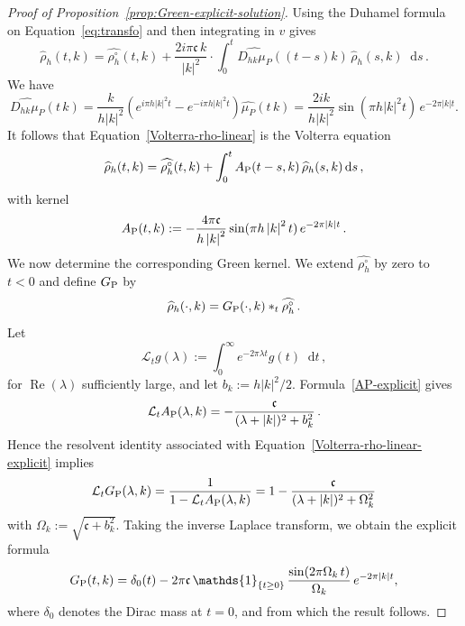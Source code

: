 \documentclass[a4paper,12pt]{amsart} %
\theoremstyle{plain}
\theoremstyle{definition}
\renewcommand	{\L}		{\mathcal L}		%
\newcommand		{\lt}			{\left}				%
\newcommand		{\rt}			{\right}			%
\renewcommand	{\(}			{\lt(}
\renewcommand	{\)}			{\rt)}
\newcommand		{\n}[1]			{\lt\lvert{#1}\rt\rvert}	%
\newcommand		{\indic}	{\mathds{1}}		%
\renewcommand		{\d}		{\mathop{}\!\mathrm{d}}		%
\DeclareMathOperator{\re}		{Re}				%
\renewcommand	{\Re}[1]		{\re\!\( #1 \)}		%
\newcommand	{\h}			{h}
\newcommand		{\CK}			{\mathfrak{c}}	%
\begin{document}
	\begin{proof}[Proof of Proposition~\ref{prop:Green-explicit-solution}]
		Using the Duhamel formula on Equation~\eqref{eq:transfo} and then integrating in $v$ gives
		\begin{equation}\label{Volterra-rho-linear}
			\widehat\rho_\h(t,k) = \widehat{\rho_\h^\circ}(t,k) + \frac{2i\pi\CK\, k}{\n{k}^2}\cdot \int_0^t
			\widehat{D_{hk}\mu_P}(\lt(t-s\rt) k) \,\widehat\rho_\h(s,k) \d s \, .
		\end{equation}
		We have 
		\begin{equation*} %
		\widehat{D_{hk}\mu_P}(t\, k)
			=\frac{k}{h\n{k}^2}
			\left(e^{i\pi h\n{k}^2 t}-e^{-i\pi h\n{k}^2 t}\right)
			\widehat{\mu_P}(t\, k)
			=\frac{2 i k}{h\n{k}^2}
			\sin(\pi h\n{k}^2 t) \, e^{-2\pi\n{k}t} .
		\end{equation*}
		It follows that Equation~\eqref{Volterra-rho-linear} is the Volterra equation
		\begin{equation}\label{Volterra-rho-linear-explicit}
			\widehat\rho_\h(t,k) = \widehat{\rho_\h^\circ}(t,k) + \int_0^t A_\textnormal{P}(t-s,k) \, \widehat\rho_\h(s,k) \d s \, ,
		\end{equation}
		with kernel
		\begin{equation}\label{AP-explicit}
			A_\textnormal{P}(t,k) :=-\frac{4\pi\CK}{h\n{k}^2} \sin(\pi h\n{k}^2t) \, e^{-2\pi\n{k}t} \, .
		\end{equation}
		We now determine the corresponding Green kernel. We extend $\widehat{\rho_\h^\circ}$ by zero to $t<0$ and define $G_\textnormal{P}$ by
		\begin{equation}\label{Green-convolution}
			\widehat\rho_\h(\cdot,k) = G_\textnormal{P}(\cdot,k)*_t \widehat{\rho_\h^\circ} \, .
		\end{equation}
		Let 
		\begin{equation*}
			\L_t g(\lambda):=\int_0^\infty e^{-2\pi\lambda t}g(t) \d t \, ,
		\end{equation*}
		for $\Re \lambda$ sufficiently large, and let $b_k := h\n{k}^2/2$. Formula~\eqref{AP-explicit} gives
		\begin{equation*}
			\L_t A_\textnormal{P}(\lambda,k)
			=-\frac{\CK}{(\lambda+\n{k})^2+b_k^2} \, .
		\end{equation*}
		Hence the resolvent identity associated with Equation~\eqref{Volterra-rho-linear-explicit} implies
		\begin{equation*}
			\L_tG_\textnormal{P}(\lambda,k)
			=\frac{1}{1-\L_tA_\textnormal{P}(\lambda,k)} = 1-\frac{\CK}{(\lambda+\n{k})^2+\Omega_k^2}
		\end{equation*}
		with $\Omega_k:=\sqrt{\CK+b_k^2}$. Taking the inverse Laplace transform, we obtain the explicit formula
		\begin{equation*} %
			G_\textnormal{P}(t,k) =\delta_0(t) - 2\pi\CK \,\indic_{\{t\ge0\}} \, \frac{\sin(2\pi\Omega_k\, t)}{\Omega_k} \, e^{-2\pi \n{k}t},
		\end{equation*}
		where $\delta_0$ denotes the Dirac mass at $t=0$, and from which the result follows.
	\end{proof}
\end{document}
